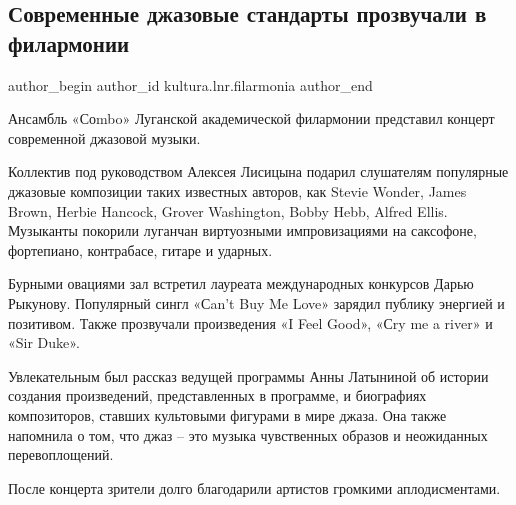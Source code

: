  
 
 
 
 
\subsection{Современные джазовые стандарты прозвучали в филармонии}
\label{sec:21_01_2022.stz.kultura.lnr.filarmonia.1.jazz}
 
\ifcmt
 author_begin
   author_id kultura.lnr.filarmonia
 author_end
\fi

\begin{zznagolos}
Ансамбль «Соmbo» Луганской академической филармонии представил концерт
современной джазовой музыки.
\end{zznagolos}


Коллектив под руководством Алексея Лисицына подарил слушателям популярные
джазовые композиции таких известных авторов, как Stevie Wonder, James Brown,
Herbie Hancock, Grover Washington, Bobby Hebb, Alfred Ellis. Музыканты покорили
луганчан виртуозными импровизациями на саксофоне, фортепиано, контрабасе,
гитаре и ударных.


Бурными овациями зал встретил лауреата международных конкурсов Дарью Рыкунову.
Популярный сингл «Сan’t Buy Me Love» зарядил публику энергией и позитивом.
Также прозвучали произведения «I Feel Good», «Сry me a river» и «Sir Duke».


Увлекательным был рассказ ведущей программы Анны Латыниной об истории создания
произведений, представленных в программе, и биографиях композиторов, ставших
культовыми фигурами в мире джаза. Она также напомнила о том, что джаз – это
музыка чувственных образов и неожиданных перевоплощений.

После концерта зрители долго благодарили артистов громкими аплодисментами.
